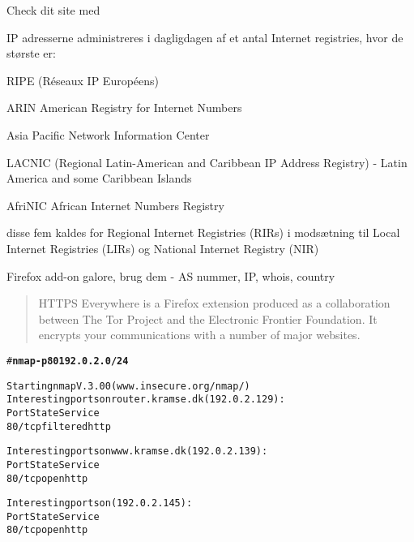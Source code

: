 \documentclass[Screen16to9,17pt]{foils}
\begin{document}
Check dit site med 


\begin{list1}
\item IP adresserne administreres i dagligdagen af et antal Internet
  registries, hvor de største er:
\begin{list2}
\item RIPE (Réseaux IP Européens)  
\item ARIN American Registry for Internet Numbers 
\item Asia Pacific Network Information Center 
\item LACNIC (Regional Latin-American and Caribbean IP Address
  Registry) - Latin America and some Caribbean Islands
\item AfriNIC African Internet Numbers Registry 
\end{list2}
\item disse fem kaldes for Regional Internet Registries (RIRs) i
  modsætning til Local Internet Registries (LIRs) og National Internet
  Registry (NIR)
\end{list1}

\vskip 1cm
\centerline{Firefox add-on galore, brug dem - AS nummer, IP, whois, country}




\begin{quote}
HTTPS Everywhere is a Firefox extension produced as a collaboration between The Tor Project and the Electronic Frontier Foundation. It encrypts your communications with a number of major websites.
\end{quote}

\centerline{}



\centerline{}



\begin{alltt}\footnotesize
\small # {\bfseries nmap  -p 80 192.0.2.0/24}

Starting nmap V. 3.00 ( www.insecure.org/nmap/ )
Interesting ports on router.kramse.dk (192.0.2.129):
Port       State       Service
80/tcp     filtered    http

Interesting ports on www.kramse.dk (192.0.2.139):
Port       State       Service
80/tcp     open        http

Interesting ports on  (192.0.2.145):
Port       State       Service
80/tcp     open        http

\end{alltt}
\end{document}
